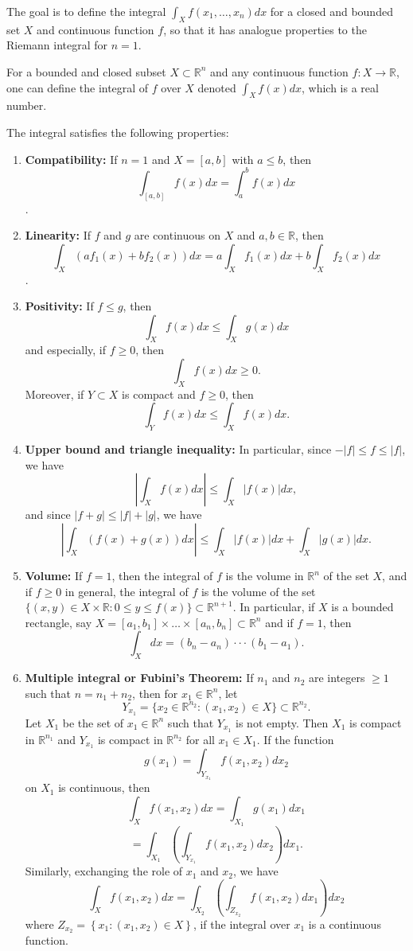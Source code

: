 \documentclass[]{article}
\providecommand{\tightlist}{%
  \setlength{\itemsep}{0pt}\setlength{\parskip}{0pt}}
\begin{document}
\begin{multicols*}{3}
The goal is to define the integral $\int_Xf(x_1, \dots , x_n)dx$ for a
closed and bounded set $X$ and continuous function $f$, so that it
has analogue properties to the Riemann integral for $n=1$.

For a bounded and closed subset $X \subset \mathbb R^n$ and any
continuous function $f:X \rightarrow \mathbb{R}$, one can define the
integral of $f$ over $X$ denoted $\int_Xf(x)dx$, which is a real
number.

The integral satisfies the following properties:

\begin{enumerate}
  \def\labelenumi{\arabic{enumi}.}
  \tightlist
\item
  \textbf{Compatibility:}
  If \textbf{$n=1$} and $X=[a,b]$ with
  $a\leq b$, then $$\int_{[a,b]}f(x)dx=\int_a^bf(x)dx$$.
\item
  \textbf{Linearity:}
  If $f$ and $g$ are continuous on $X$ and
  $a,b \in \mathbb{R}$, then
  $$\int_X(af_1(x)+bf_2(x))dx = a\int_Xf_1(x)dx+b\int_Xf_2(x)dx$$.
\item
  \textbf{Positivity:} If $f\leq g$, then
  $$\int_Xf(x)dx\leq\int_Xg(x)dx$$ and especially, if $f \geq 0$, then
  $$\int_Xf(x)dx \geq 0.$$ Moreover, if $Y \subset X$ is compact and
  $f\geq 0$, then $$\int_Yf(x)dx\leq\int_Xf(x)dx.$$
\item
  \textbf{Upper bound and triangle inequality:} In particular, since
  $-|f|\leq f \leq |f|$, we have
  $$\left| \int_Xf(x)dx \right| \leq \int_X|f(x)|dx,$$ and since
  $|f+g| \leq |f| + |g|$, we have
  $$\left| \int_X(f(x)+g(x))dx \right| \leq \int_X|f(x)|dx + \int_X|g(x)|dx.$$
\item
  \textbf{Volume:} If $f=1$, then the integral of $f$ is the
  volume in $\mathbb R^n$ of the set $X$, and if $f\geq 0$
  in general, the integral of $f$ is the volume of the set
  $\{(x,y) \in X \times \mathbb{R} : 0 \leq y \leq f(x)\} \subset \mathbb R^{n+1}$.
  In particular, if $X$ is a bounded rectangle, say
  $X = [a_1,b_1] \times \dots \times [a_n, b_n] \subset \mathbb R^n$
  and if $f=1$, then $$\int_Xdx=(b_n-a_n) \cdot\cdot\cdot(b_1-a_1).$$
\item
  \textbf{Multiple integral or Fubini's Theorem:} If $n_1$ and $n_2$
  are integers $\geq 1$ such that $n=n_1+n_2$, then for
  $x_1 \in\mathbb R^n$, let
  $$Y_{x_1} = \{x_2\in\mathbb R^{n_2}:(x_1, x_2)\in X\} \subset \mathbb R^{n_2}.$$
  Let $X_1$ be the set of $x_1 \in \mathbb R^n$ such that
  $Y_{x_1}$ is not empty. Then $X_1$ is compact in
  $\mathbb R^{n_1}$ and $Y_{x_1}$ is compact in
  $\mathbb R^{n_2}$ for all $x_1\in X_1$. If the function
  $$g(x_1)=\int_{Y_{x_1}}f(x_1,x_2)dx_2$$ on $X_1$ is continuous, then
  $$\int_Xf(x_1,x_2)dx=\int_{X_1}g(x_1)dx_1$$
  $$=\int_{X_1}\left(\int_{Y_{x_1}}f(x_1,x_2)dx_2\right)dx_1.$$
  Similarly, exchanging the role of $x_1$ and $x_2$, we have
  $$\int_{X} f\left(x_{1}, x_{2}\right) d x=\int_{X_{2}}\left(\int_{Z_{x_{2}}}
  f\left(x_{1}, x_{2}\right) d x_{1}\right) d x_{2}$$
  where
  $Z_{x_{2}}=\left\{x_{1}:\left(x_{1}, x_{2}\right) \in X\right\}$, if
  the integral over $x_1$ is a continuous function.
\end{enumerate}


\end{multicols*}
\end{document}
